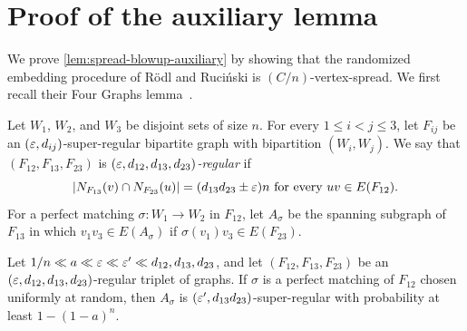 \documentclass[11pt]{amsart}
\begin{document}
\section{Proof of the auxiliary lemma}\label{lem:RR-proof-of-auxiliary}

We prove \cref{lem:spread-blowup-auxiliary} by showing that the randomized
embedding procedure of R\"{o}dl and Ruci\'{n}ski is $(C/n)$-vertex-spread.  We
first recall their Four Graphs lemma~\cite{RR99}.

Let $W_1$, $W_2$, and $W_3$ be disjoint sets of size $n$.  For every
$1\leq i<j\leq 3$, let $F_{ij}$ be an $(\varepsilon,d_{ij})$-super-regular
bipartite graph with bipartition $(W_i,W_j)$.  We say that
$(F_{12},F_{13},F_{23})$ is \textit{$(\varepsilon,d_{12},d_{13},d_{23})$-regular}
if
\begin{equation}\label{eqn:eps-regular-triple}
    \left|N_{F_{13}}(v) \cap N_{F_{23}}(u)\right| = (d_{13}d_{23} \pm \varepsilon)n \text{ for every } uv \in E(F_{12}).
\end{equation}
For a perfect matching $\sigma:W_1\rightarrow W_2$ in $F_{12}$, let
$A_\sigma$ be the spanning subgraph of $F_{13}$ in which
$v_1v_3\in E(A_\sigma)$ if $\sigma(v_1)v_3\in E(F_{23})$.

\begin{lemma}\label{lem:spread-four-graphs}
    Let $1 / n \ll a \ll \varepsilon \ll \varepsilon' \ll d_{12}, d_{13}, d_{23}$, %
    and let $(F_{12}, F_{13}, F_{23})$ be an $(\varepsilon, d_{12}, d_{13}, d_{23})$-regular triplet of graphs.
    If $\sigma$ is a perfect matching of $F_{12}$ chosen uniformly at random, then $A_\sigma$ is $(\varepsilon', d_{13}d_{23})$-super-regular with probability at least $1 - (1 - a)^n$.
\end{lemma}






\end{document}
